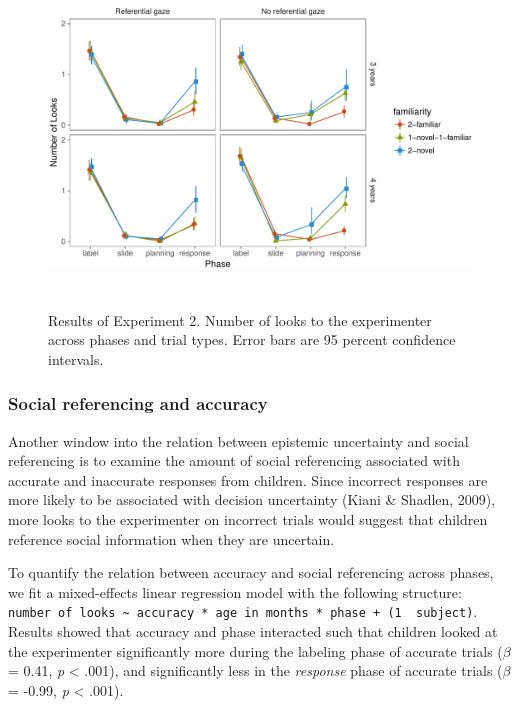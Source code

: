 \documentclass[a4paper,man,apacite,floatsintext]{apa6}
\newenvironment{CodeChunk}{}{}
\begin{document}
\begin{CodeChunk}
\begin{figure}[h]

{\centering \includegraphics[width=5.75in,height=3.5in]{figs/results_e2-1} 

}

\caption[Results of Experiment 2]{Results of Experiment 2. Number of looks to the experimenter across phases and trial types. Error bars are 95 percent confidence intervals.}\label{fig:results_e2}
\end{figure}
\end{CodeChunk}

\subsubsection{Social referencing and
accuracy}\label{social-referencing-and-accuracy}

Another window into the relation between epistemic uncertainty and
social referencing is to examine the amount of social referencing
associated with accurate and inaccurate responses from children. Since
incorrect responses are more likely to be associated with decision
uncertainty (Kiani \& Shadlen, 2009), more looks to the experimenter on
incorrect trials would suggest that children reference social
information when they are uncertain.

To quantify the relation between accuracy and social referencing across
phases, we fit a mixed-effects linear regression model with the
following structure:
\texttt{number\ of\ looks\ \textasciitilde{}\ accuracy\ *\ age\ in\ months\ *\ phase\ +\ (1\ \textbar{}\ subject)}.
Results showed that accuracy and phase interacted such that children
looked at the experimenter significantly more during the labeling phase
of accurate trials (\(\beta\) = 0.41, \emph{p} \textless{} .001), and
significantly less in the \emph{response} phase of accurate trials
(\(\beta\) = -0.99, \emph{p} \textless{} .001).
\end{document}
